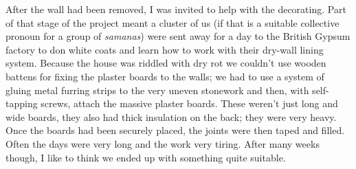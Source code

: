 After the wall had been removed, I was invited to help with the
decorating. Part of that stage of the project meant a cluster of us (if
that is a suitable collective pronoun for a group of \emph{samanas})
were sent away for a day to the British Gypsum factory to don white
coats and learn how to work with their dry-wall lining system. Because
the house was riddled with dry rot we couldn't use wooden battens for
fixing the plaster boards to the walls; we had to use a system of gluing
metal furring strips to the very uneven stonework and then, with
self-tapping screws, attach the massive plaster boards. These weren't
just long and wide boards, they also had thick insulation on the back;
they were very heavy. Once the boards had been securely placed, the
joints were then taped and filled. Often the days were very long and the
work very tiring. After many weeks though, I like to think we ended up
with something quite suitable.

